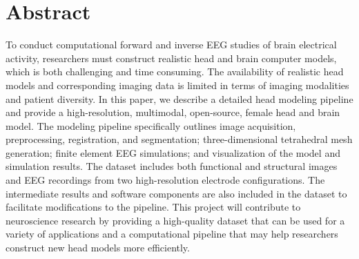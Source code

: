 %

\section*{Abstract}

To conduct computational forward and inverse EEG studies of brain electrical activity, researchers must construct realistic head and brain computer models, which is both challenging and time consuming. The availability of realistic head models and corresponding imaging data is limited in terms of imaging modalities and patient diversity. In this paper, we describe a detailed head modeling pipeline and provide a high-resolution, multimodal, open-source, female head and brain model. The modeling pipeline specifically outlines image acquisition, preprocessing, registration, and segmentation; three-dimensional tetrahedral mesh generation; finite element EEG simulations; and visualization of the model and simulation results. The dataset includes both functional and structural images and EEG recordings from two high-resolution electrode configurations. The intermediate results and software components are also included in the dataset to facilitate modifications to the pipeline. This project will contribute to neuroscience research by providing a high-quality dataset that can be used for a variety of applications and a computational pipeline that may help researchers construct new head models more efficiently.